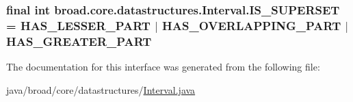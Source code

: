 \hypertarget{interfacebroad_1_1core_1_1datastructures_1_1_interval_aa24dfd48992d1f74f751a7b2922f0eed}{
\subsubsection[{I\+S\+\_\+\+S\+U\+P\+E\+R\+S\+E\+T}]{\setlength{\rightskip}{0pt plus 5cm}final int broad.\+core.\+datastructures.\+Interval.\+I\+S\+\_\+\+S\+U\+P\+E\+R\+S\+E\+T = {\bf H\+A\+S\+\_\+\+L\+E\+S\+S\+E\+R\+\_\+\+P\+A\+R\+T} $\vert$ {\bf H\+A\+S\+\_\+\+O\+V\+E\+R\+L\+A\+P\+P\+I\+N\+G\+\_\+\+P\+A\+R\+T} $\vert$ {\bf H\+A\+S\+\_\+\+G\+R\+E\+A\+T\+E\+R\+\_\+\+P\+A\+R\+T}\hspace{0.3cm}{\ttfamily [static]}}}\label{interfacebroad_1_1core_1_1datastructures_1_1_interval_aa24dfd48992d1f74f751a7b2922f0eed}


The documentation for this interface was generated from the following file\+:\begin{DoxyCompactItemize}
\item 
java/broad/core/datastructures/\hyperlink{_interval_8java}{Interval.\+java}\end{DoxyCompactItemize}
